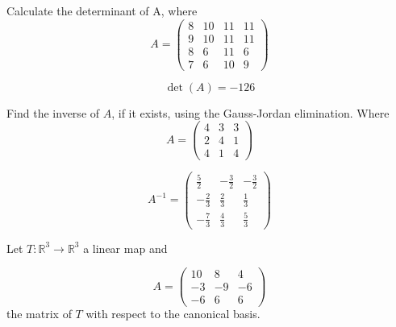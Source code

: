 \begin{questions}

\question Calculate the determinant of A, where
$$
A=\left(\begin{array}{rrrr}
8 & 10 & 11 & 11 \\
9 & 10 & 11 & 11 \\
8 & 6 & 11 & 6 \\
7 & 6 & 10 & 9
\end{array}\right)
$$

\begin{solution}
$$\det(A)=-126$$
\end{solution}

\question Find the inverse of $A$, if it exists, using the Gauss-Jordan elimination. Where
$$
A=\left(\begin{array}{rrr}
4 & 3 & 3 \\
2 & 4 & 1 \\
4 & 1 & 4
\end{array}\right)
$$

\begin{solution}
$$A^{-1}=\left(\begin{array}{rrr}
\frac{5}{2} & -\frac{3}{2} & -\frac{3}{2} \\
-\frac{2}{3} & \frac{2}{3} & \frac{1}{3} \\
-\frac{7}{3} & \frac{4}{3} & \frac{5}{3}
\end{array}\right)$$
\end{solution}

\question Let $T:\mathbb{R}^3\rightarrow\mathbb{R}^3$  a linear map and
 
$$
A=\left(\begin{array}{rrr}
10 & 8 & 4 \\
-3 & -9 & -6 \\
-6 & 6 & 6
\end{array}\right)
$$
the matrix of $T$ with respect to the canonical basis.
\end{questions}
